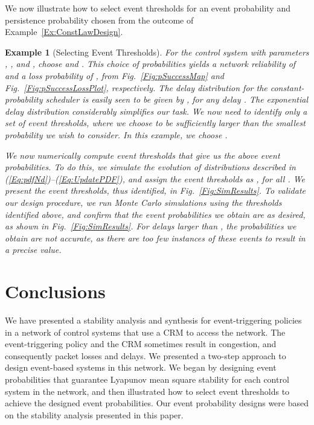 \documentclass[twocolumn]{autart}
\newtheorem{example}{Example}[section]
\begin{document}
We now illustrate how to select event thresholds for an event probability  and persistence probability  chosen from the outcome of Example~\ref{Ex:ConstLawDesign}.
\begin{example}[Selecting Event Thresholds] \label{Ex:SelectLevels}
For the control system with parameters , ,  and , choose  and . This choice of probabilities yields a network reliability of  and a loss probability of , from Fig.~\ref{Fig:pSuccessMap} and Fig.~\ref{Fig:pSuccessLossPlot}, respectively. The delay distribution for the constant-probability scheduler is easily seen to be given by , for any delay . The exponential delay distribution considerably simplifies our task. We now need to identify only a set of  event thresholds, where we choose  to be sufficiently larger than the smallest probability we wish to consider. In this example, we choose . 

We now numerically compute event thresholds that give us the above event probabilities. To do this, we simulate the evolution of distributions described in (\ref{Eq:pdfNd})--(\ref{Eq:UpdatePDF}), and assign the event thresholds as , for all . We present the event thresholds, thus identified, in Fig.~\ref{Fig:SimResults}. To validate our design procedure, we run Monte Carlo simulations using the thresholds identified above, and confirm that the event probabilities we obtain are as desired, as shown in Fig.~\ref{Fig:SimResults}. For delays larger than , the probabilities we obtain are not accurate, as there are too few instances of these events to result in a precise value. \end{example}



\section{Conclusions} \label{S:Conclusions}

We have presented a stability analysis and synthesis for event-triggering policies in a network of control systems that use a CRM to access the network. The event-triggering policy and the CRM sometimes result in congestion, and consequently packet losses and delays. We presented a two-step approach to design event-based systems in this network. We began by designing event probabilities that guarantee Lyapunov mean square stability for each control system in the network, and then illustrated how to select event thresholds to achieve the designed event probabilities. Our event probability designs were based on the stability analysis presented in this paper.
\end{document}
